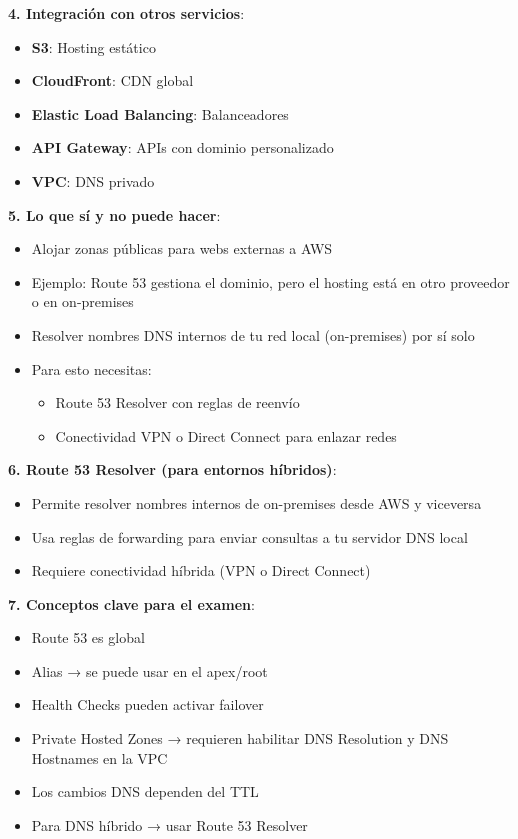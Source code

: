 \documentclass[12pt,a4paper]{report}
\begin{document}
\textbf{4. Integración con otros servicios}:
\begin{itemize}
    \item \textbf{S3}: Hosting estático
    \item \textbf{CloudFront}: CDN global
    \item \textbf{Elastic Load Balancing}: Balanceadores
    \item \textbf{API Gateway}: APIs con dominio personalizado
    \item \textbf{VPC}: DNS privado
\end{itemize}

\textbf{5. Lo que sí y no puede hacer}:

\begin{tipbox}[Puede]
\begin{itemize}
    \item Alojar zonas públicas para webs externas a AWS
    \item Ejemplo: Route 53 gestiona el dominio, pero el hosting está en otro proveedor o en on-premises
\end{itemize}
\end{tipbox}

\begin{warningbox}[No puede]
\begin{itemize}
    \item Resolver nombres DNS internos de tu red local (on-premises) por sí solo
    \item Para esto necesitas:
    \begin{itemize}
        \item Route 53 Resolver con reglas de reenvío
        \item Conectividad VPN o Direct Connect para enlazar redes
    \end{itemize}
\end{itemize}
\end{warningbox}

\textbf{6. Route 53 Resolver (para entornos híbridos)}:
\begin{itemize}
    \item Permite resolver nombres internos de on-premises desde AWS y viceversa
    \item Usa reglas de forwarding para enviar consultas a tu servidor DNS local
    \item Requiere conectividad híbrida (VPN o Direct Connect)
\end{itemize}

\textbf{7. Conceptos clave para el examen}:
\begin{itemize}
    \item Route 53 es global
    \item Alias → se puede usar en el apex/root
    \item Health Checks pueden activar failover
    \item Private Hosted Zones → requieren habilitar DNS Resolution y DNS Hostnames en la VPC
    \item Los cambios DNS dependen del TTL
    \item Para DNS híbrido → usar Route 53 Resolver
\end{itemize}
\end{document}
